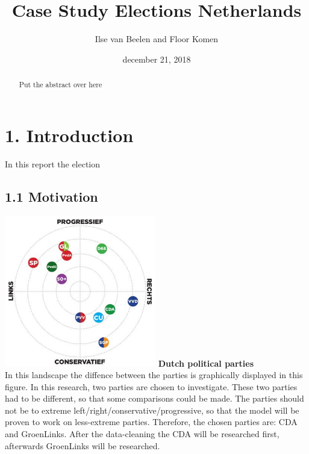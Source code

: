 \documentclass[11pt,]{article}
\title{Case Study Elections Netherlands}
\author{Ilse van Beelen and Floor Komen}
\date{december 21, 2018}
\begin{document}
\maketitle
\begin{abstract}
Put the abstract over here
\end{abstract}

\section{1. Introduction}\label{introduction}

In this report the election

\subsection{1.1 Motivation}\label{motivation}

\includegraphics[width=2.60417in]{Partijlandschap.jpg} \textbf{Dutch
political parties}\\
In this landscape the diffence between the parties is graphically
displayed in this figure. In this research, two parties are chosen to
investigate. These two parties had to be different, so that some
comparisons could be made. The parties should not be to extreme
left/right/conservative/progressive, so that the model will be proven to
work on less-extreme parties. Therefore, the chosen parties are: CDA and
GroenLinks. After the data-cleaning the CDA will be researched first,
afterwards GroenLinks will be researched.
\end{document}
